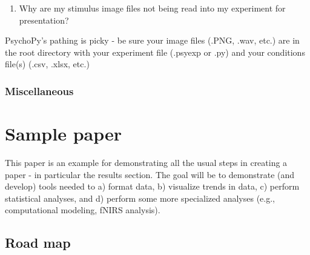 \documentclass[
]{book}
\providecommand{\tightlist}{%
  \setlength{\itemsep}{0pt}\setlength{\parskip}{0pt}}
\begin{document}
\begin{enumerate}
\def\labelenumi{(\arabic{enumi})}
\setcounter{enumi}{4}
\tightlist
\item
  Why are my stimulus image files not being read into my experiment for presentation?
\end{enumerate}

PsychoPy's pathing is picky - be sure your image files (.PNG, .wav, etc.) are in the root directory with your experiment file (.psyexp or .py) and your conditions file(s) (.csv, .xlsx, etc.)

\hypertarget{miscellaneous}{%
\subsection{Miscellaneous}\label{miscellaneous}}

\hypertarget{sample_paper}{%
\chapter{Sample paper}\label{sample_paper}}

This paper is an example for demonstrating all the usual steps in creating a paper - in particular the results section. The goal will be to demonstrate (and develop) tools needed to a) format data, b) visualize trends in data, c) perform statistical analyses, and d) perform some more specialized analyses (e.g., computational modeling, fNIRS analysis).

\hypertarget{road-map}{%
\section{Road map}\label{road-map}}
\end{document}
